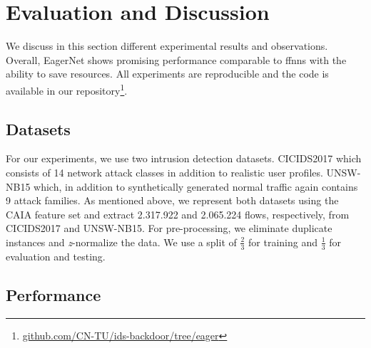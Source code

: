 \documentclass[conference]{IEEEtran}
\begin{document}


\section{Evaluation and Discussion}
\label{evaluation_and_discussion}
We discuss in this section different experimental results and observations. Overall, EagerNet shows promising performance comparable to \glspl{ffnn} with the ability to save resources. All experiments are reproducible and the code is available in our repository\footnote{\url{github.com/CN-TU/ids-backdoor/tree/eager}}.

\subsection{Datasets}
For our experiments, we use two intrusion detection datasets. CICIDS2017 \cite{sharafaldin_toward_2018} which consists of 14 network attack classes in addition to realistic user profiles. UNSW-NB15 \cite{moustafa_unsw-nb15_2015} which, in addition to synthetically generated normal traffic again contains 9 attack families. As mentioned above, we represent both datasets using the CAIA feature set and extract 2.317.922 and 2.065.224 flows, respectively, from CICIDS2017 and UNSW-NB15. For pre-processing, we eliminate duplicate instances and \emph{z}-normalize the data. We use a split of $\frac{2}{3}$ for training and $\frac{1}{3}$ for evaluation and testing.

\subsection{Performance}
\end{document}
